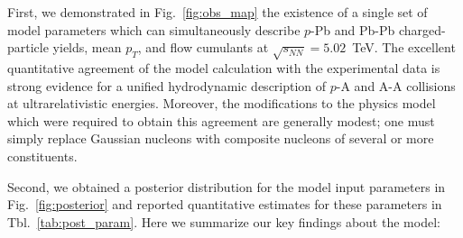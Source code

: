 \documentclass[aps,prc,reprint,amsmath,nofootinbib]{revtex4-1}
\newcommand{\sqrts}{\sqrt{s_{NN}}}
\begin{document}
First, we demonstrated in Fig.~\ref{fig:obs_map} the existence of a single set of model parameters which can simultaneously describe $p$-Pb and Pb-Pb charged-particle yields, mean $p_T$, and flow cumulants at $\sqrts=5.02$~TeV.
The excellent quantitative agreement of the model calculation with the experimental data is strong evidence for a unified hydrodynamic description of $p$-A and A-A collisions at ultrarelativistic energies.
Moreover, the modifications to the physics model which were required to obtain this agreement are generally modest; one must simply replace Gaussian nucleons with composite nucleons of several or more constituents.

Second, we obtained a posterior distribution for the model input parameters in Fig.~\ref{fig:posterior} and reported quantitative estimates for these parameters in Tbl.~\ref{tab:post_param}.
Here we summarize our key findings about the model:
\end{document}
